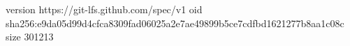 version https://git-lfs.github.com/spec/v1
oid sha256:e9da05d99d4cfca8309fad06025a2e7ae49899b5ce7cdfbd1621277b8aa1c08c
size 301213
